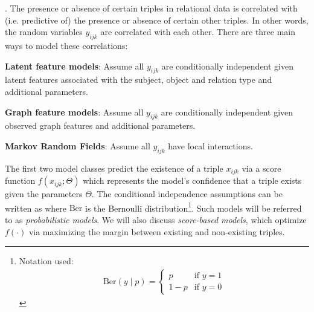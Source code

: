 \documentclass[11pt]{article}
\newcommand\myspace[1][]{\vspace{#1\bigskipamount}}
\newcommand\p{\Needspace{10\baselineskip} \noindent}
\begin{document}
\myspace
\p {}. The presence or absence of certain triples in relational data is correlated with (i.e. predictive of) the presence or absence of certain other triples. In other words, the random variables $y_{ijk}$ are correlated with each other. There are three main ways to model these correlations:
\begin{compactenum}
	\item \textbf{Latent feature models}: Assume all $y_{ijk}$ are conditionally independent given latent features associated with the subject, object and relation type and additional parameters.
	
	\item \textbf{Graph feature models}: Assume all $y_{ijk}$ are conditionally independent given observed graph features and additional parameters.
	
	\item \textbf{Markov Random Fields}: Assume all $y_{ijk}$ have local interactions.
\end{compactenum}
The first two model classes predict the existence of a triple $x_{ijk}$ via a score function $f(x_{ijk}; \Theta)$ which represents the model's confidence that a triple exists given the parameters $\Theta$. The conditional independence assumptions can be written as
where $\text{Ber}$ is the Bernoulli distribution\footnote{Notation used:\begin{align}
	\text{Ber}(y\mid p) = \begin{cases}
		p & \text{if } y = 1 \\
		1 - p & \text{if } y = 0
	\end{cases}
\end{align}}. Such models will be referred to as \textit{probabilistic models}. We will also discuss \textit{score-based models}, which optimize $f(\cdot)$ via maximizing the margin between existing and non-existing triples.
\end{document}
